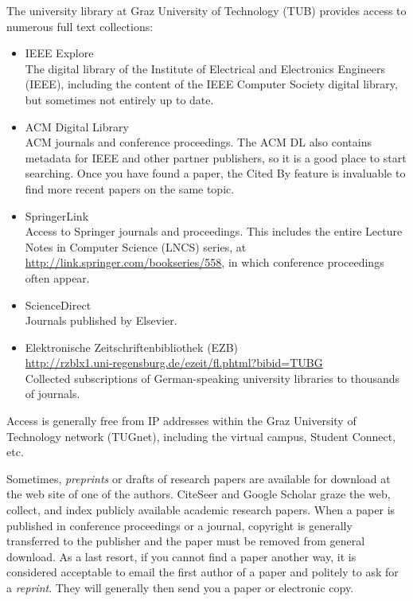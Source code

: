 The university library at Graz University of Technology (TUB)
 provides access to numerous full text
collections:
\begin{itemize}
\item IEEE Explore  \\
  The digital library of the Institute of Electrical and Electronics
  Engineers (IEEE), including the content of the IEEE Computer Society
  digital library, but sometimes not entirely up to date.

\item ACM Digital Library  \\
  ACM journals and conference proceedings. The ACM DL also contains
  metadata for IEEE and other partner publishers, so it is a good place
  to start searching. Once you have found a paper, the Cited By feature
  is invaluable to find more recent papers on the same topic.

\item SpringerLink  \\
  Access to Springer journals and proceedings. This includes the entire
  Lecture Notes in Computer Science (LNCS) series, at
  \url{http://link.springer.com/bookseries/558}, in which conference
  proceedings often appear.

\item ScienceDirect  \\
  Journals published by Elsevier.

\item Elektronische Zeitschriftenbibliothek (EZB) \\
  \url{http://rzblx1.uni-regensburg.de/ezeit/fl.phtml?bibid=TUBG} \\
  Collected subscriptions of German-speaking university libraries
  to thousands of journals.
\end{itemize}
Access is generally free from IP addresses within the Graz University
of Technology network (TUGnet), including the virtual campus, Student
Connect, etc.


Sometimes, \emph{preprints} or drafts of research papers are available
for download at the web site of one of the authors. CiteSeer and
Google Scholar graze the web, collect, and index publicly available
academic research papers. When a paper is published in conference
proceedings or a journal, copyright is generally transferred to the
publisher and the paper must be removed from general download. As a
last resort, if you cannot find a paper another way, it is considered
acceptable to email the first author of a paper and politely to ask
for a \emph{reprint}. They will generally then send you a paper or
electronic copy.


